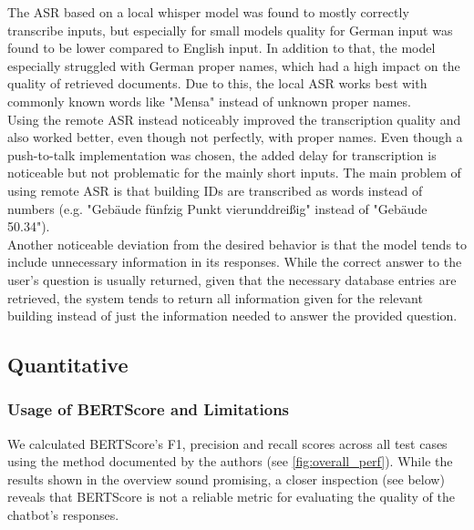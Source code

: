 \documentclass{article}
\begin{document}
The ASR based on a local whisper model was found to mostly correctly transcribe inputs, but especially for small models quality for German input was found to be lower compared to English input. In addition to that, the model especially struggled with German proper names, which had a high impact on the quality of retrieved documents. Due to this, the local ASR works best with commonly known words like "Mensa" instead of unknown proper names.\\

Using the remote ASR instead noticeably improved the transcription quality and also worked better, even though not perfectly, with proper names. Even though a push-to-talk implementation was chosen, the added delay for transcription is noticeable but not problematic for the mainly short inputs. The main problem of using remote ASR is that building IDs are transcribed as words instead of numbers (e.g. "Gebäude fünfzig Punkt vierunddreißig" instead of "Gebäude 50.34").\\

Another noticeable deviation from the desired behavior is that the model tends to include unnecessary information in its responses. While the correct answer to the user's question is usually returned, given that the necessary database entries are retrieved, the system tends to return all information given for the relevant building instead of just the information needed to answer the provided question.

\subsection{Quantitative} \label{sec:eval_quant}

\subsubsection{Usage of BERTScore and Limitations}
We calculated BERTScore's F1, precision and recall scores across all test cases using the method documented by the authors (see \cref{fig:overall_perf}). While the results shown in the overview sound promising, a closer inspection (see below) reveals that BERTScore is not a reliable metric for evaluating the quality of the chatbot's responses.\\
\end{document}
